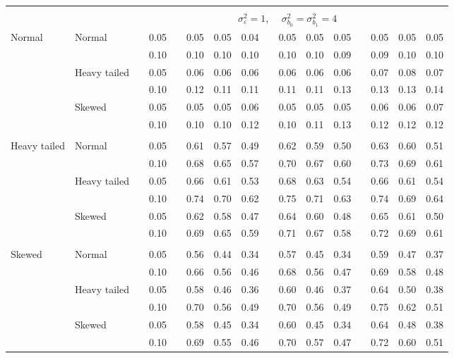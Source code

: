 \documentclass[12pt]{article} %
\begin{document}
\begin{table}[ht]
\begin{scriptsize}
\begin{center}
\begin{tabular}{ll p{.1cm} c p{.1cm} rrr p{.1cm} rrr p{.1cm} rrr}
&&&&&&&&&&&&&&&\\
& && && \multicolumn{9}{c}{$\sigma_{\varepsilon}^2 = 1$, \ \ $\sigma_{b_0}^2 = \sigma_{b_1}^2 = 4$} \\ \cline{6-16}
\rowcolor{gray!20}Normal       & Normal       && 0.05 &&   0.05 & 0.05 & 0.04 && 0.05 & 0.05 & 0.05 &&  0.05 & 0.05 & 0.05 \\
\rowcolor{gray!20}             &              && 0.10 &&   0.10 & 0.10 & 0.10 && 0.10 & 0.10 & 0.09 &&  0.09 & 0.10 & 0.10 \\
\rowcolor{gray!20}             & Heavy tailed && 0.05 &&   0.06 & 0.06 & 0.06 && 0.06 & 0.06 & 0.06 &&  0.07 & 0.08 & 0.07 \\
\rowcolor{gray!20}             &              && 0.10 &&   0.12 & 0.11 & 0.11 && 0.11 & 0.11 & 0.13 &&  0.13 & 0.13 & 0.14 \\
\rowcolor{gray!20}             & Skewed       && 0.05 &&   0.05 & 0.05 & 0.06 && 0.05 & 0.05 & 0.05 &&  0.06 & 0.06 & 0.07 \\
\rowcolor{gray!20}             &              && 0.10 &&   0.10 & 0.10 & 0.12 && 0.10 & 0.11 & 0.13 &&  0.12 & 0.12 & 0.12 \\
             &&&&&&&&&&&&&&&\\
Heavy tailed & Normal       && 0.05 &&   0.61 & 0.57 & 0.49 && 0.62 & 0.59 & 0.50 &&  0.63 & 0.60 & 0.51 \\
             &              && 0.10 &&   0.68 & 0.65 & 0.57 && 0.70 & 0.67 & 0.60 &&  0.73 & 0.69 & 0.61 \\
             & Heavy tailed && 0.05 &&   0.66 & 0.61 & 0.53 && 0.68 & 0.63 & 0.54 &&  0.66 & 0.61 & 0.54 \\
             &              && 0.10 &&   0.74 & 0.70 & 0.62 && 0.75 & 0.71 & 0.63 &&  0.74 & 0.69 & 0.64 \\
             & Skewed       && 0.05 &&   0.62 & 0.58 & 0.47 && 0.64 & 0.60 & 0.48 &&  0.65 & 0.61 & 0.50 \\
             &              && 0.10 &&   0.69 & 0.65 & 0.59 && 0.71 & 0.67 & 0.58 &&  0.72 & 0.69 & 0.61 \\
             &&&&&&&&&&&&&&&\\
Skewed       & Normal       && 0.05 &&   0.56 & 0.44 & 0.34 && 0.57 & 0.45 & 0.34 &&  0.59 & 0.47 & 0.37 \\
             &              && 0.10 &&   0.66 & 0.56 & 0.46 && 0.68 & 0.56 & 0.47 &&  0.69 & 0.58 & 0.48 \\
             & Heavy tailed && 0.05 &&   0.58 & 0.46 & 0.36 && 0.60 & 0.46 & 0.37 &&  0.64 & 0.50 & 0.38 \\
             &              && 0.10 &&   0.70 & 0.56 & 0.49 && 0.70 & 0.56 & 0.49 &&  0.75 & 0.62 & 0.51 \\
             & Skewed       && 0.05 &&   0.58 & 0.45 & 0.34 && 0.60 & 0.45 & 0.34 &&  0.64 & 0.48 & 0.38 \\
             &              && 0.10 &&   0.69 & 0.55 & 0.46 && 0.70 & 0.57 & 0.47 &&  0.72 & 0.60 & 0.51 \\


\end{tabular}
\end{center}
\end{scriptsize}
\end{table}
\end{document}
